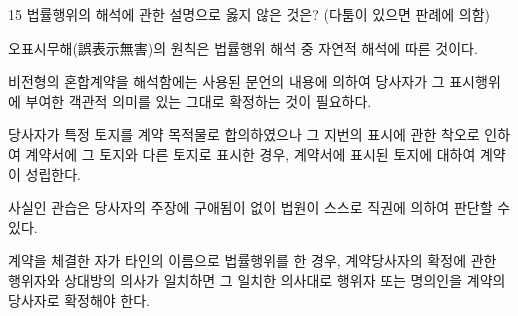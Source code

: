 \begin{question}{15}
법률행위의 해석에 관한 설명으로 옳지 않은 것은? (다툼이 있으면 판례에 의함)
\begin{choices}
  \item 오표시무해(誤表示無害)의 원칙은 법률행위 해석 중 자연적 해석에 따른 것이다.
  \item 비전형의 혼합계약을 해석함에는 사용된 문언의 내용에 의하여 당사자가 그 표시행위에 부여한 객관적 의미를 있는 그대로 확정하는 것이 필요하다.
  \item 당사자가 특정 토지를 계약 목적물로 합의하였으나 그 지번의 표시에 관한 착오로 인하여 계약서에 그 토지와 다른 토지로 표시한 경우, 계약서에 표시된 토지에 대하여 계약이 성립한다.
  \item 사실인 관습은 당사자의 주장에 구애됨이 없이 법원이 스스로 직권에 의하여 판단할 수 있다.
  \item 계약을 체결한 자가 타인의 이름으로 법률행위를 한 경우, 계약당사자의 확정에 관한 행위자와 상대방의 의사가 일치하면 그 일치한 의사대로 행위자 또는 명의인을 계약의 당사자로 확정해야 한다.
\end{choices}
\end{question}
